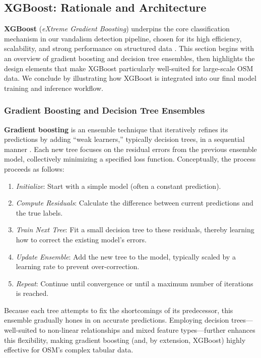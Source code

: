 \documentclass[
    13pt, %
    a4paper, %
    DIV14, %
    listof=totoc, %
    bibliography=totoc, %
    index=totoc, %
    headsepline
]{scrreprt}
\begin{document}
\subsection{XGBoost: Rationale and Architecture}
\label{sec:xgboost_rationale_architecture}

\noindent
\textbf{XGBoost} (\emph{eXtreme Gradient Boosting}) underpins the core classification mechanism in our vandalism detection pipeline, chosen for its high efficiency, scalability, and strong performance on structured data \cite{chen2016xgboost}. This section begins with an overview of gradient boosting and decision tree ensembles, then highlights the design elements that make XGBoost particularly well-suited for large-scale OSM data. We conclude by illustrating how XGBoost is integrated into our final model training and inference workflow.

\subsubsection{Gradient Boosting and Decision Tree Ensembles}
\label{sec:xgboost_background}

\noindent
\textbf{Gradient boosting} is an ensemble technique that iteratively refines its predictions by adding “weak learners,” typically decision trees, in a sequential manner \cite{friedman2001greedy}. Each new tree focuses on the residual errors from the previous ensemble model, collectively minimizing a specified loss function. Conceptually, the process proceeds as follows:

\begin{enumerate}
    \item \emph{Initialize}: Start with a simple model (often a constant prediction).
    \item \emph{Compute Residuals}: Calculate the difference between current predictions and the true labels.
    \item \emph{Train Next Tree}: Fit a small decision tree to these residuals, thereby learning how to correct the existing model’s errors.
    \item \emph{Update Ensemble}: Add the new tree to the model, typically scaled by a learning rate to prevent over-correction.
    \item \emph{Repeat}: Continue until convergence or until a maximum number of iterations is reached.
\end{enumerate}

\noindent
Because each tree attempts to fix the shortcomings of its predecessor, this ensemble gradually hones in on accurate predictions. Employing decision trees—well-suited to non-linear relationships and mixed feature types—further enhances this flexibility, making gradient boosting (and, by extension, XGBoost) highly effective for OSM’s complex tabular data.
\end{document}
